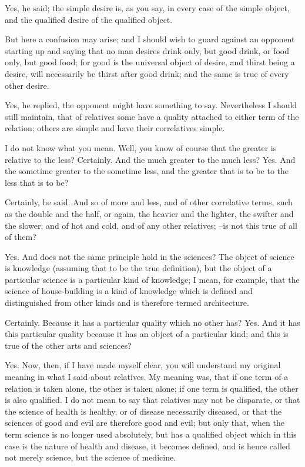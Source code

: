 Yes, he said; the simple desire is, as you say, in every case of the simple object, and the qualified desire of the qualified object.

But here a confusion may arise; and I should wish to guard against an opponent starting up and saying that no man desires drink only, but good drink, or food only, but good food; for good is the universal object of desire, and thirst being a desire, will necessarily be thirst after good drink; and the same is true of every other desire.

Yes, he replied, the opponent might have something to say.
Nevertheless I should still maintain, that of relatives some have a quality attached to either term of the relation; others are simple and have their correlatives simple.

I do not know what you mean.
Well, you know of course that the greater is relative to the less?
Certainly.
And the much greater to the much less?
Yes.
And the sometime greater to the sometime less, and the greater that is to be to the less that is to be?

Certainly, he said.
And so of more and less, and of other correlative terms, such as the double and the half, or again, the heavier and the lighter, the swifter and the slower; and of hot and cold, and of any other relatives; --is not this true of all of them?

Yes.
And does not the same principle hold in the sciences? The object of science is knowledge (assuming that to be the true definition), but the object of a particular science is a particular kind of knowledge; I mean, for example, that the science of house-building is a kind of knowledge which is defined and distinguished from other kinds and is therefore termed architecture.

Certainly.
Because it has a particular quality which no other has?
Yes.
And it has this particular quality because it has an object of a particular kind; and this is true of the other arts and sciences?

Yes.
Now, then, if I have made myself clear, you will understand my original meaning in what I said about relatives. My meaning was, that if one term of a relation is taken alone, the other is taken alone; if one term is qualified, the other is also qualified. I do not mean to say that relatives may not be disparate, or that the science of health is healthy, or of disease necessarily diseased, or that the sciences of good and evil are therefore good and evil; but only that, when the term science is no longer used absolutely, but has a qualified object which in this case is the nature of health and disease, it becomes defined, and is hence called not merely science, but the science of medicine.

